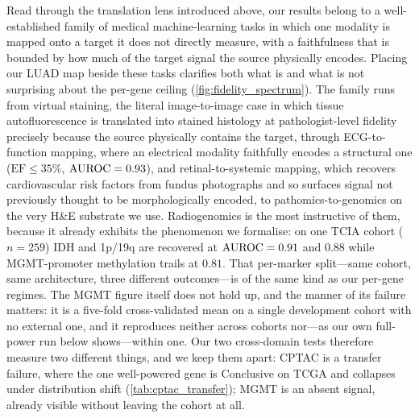 Read through the translation lens introduced above, our results
belong to a well-established family of medical machine-learning
tasks in which one modality is mapped onto a target it does not
directly measure, with a
faithfulness that is bounded by how much of the target signal the
source physically encodes.
Placing our LUAD map beside these tasks clarifies both what is and
what is not surprising about the per-gene ceiling
(\cref{fig:fidelity_spectrum}).
The family runs from virtual staining, the literal image-to-image
case in which tissue autofluorescence is translated into stained
histology at pathologist-level fidelity precisely because the source
physically contains the target\cite{rivenson2019virtualstaining},
through ECG-to-function mapping, where an electrical modality
faithfully encodes a structural one ($\mathrm{EF}\!\leq\!35\%$,
$\text{AUROC}=0.93$)\cite{attia2019ecg}, and retinal-to-systemic mapping,
which recovers cardiovascular risk factors from fundus photographs
and so surfaces signal not previously thought to be morphologically
encoded\cite{poplin2018retinal}, to pathomics-to-genomics on the
very H\&E substrate we use\cite{kather2019msi,kather2020pancancer}.
Radiogenomics is the most instructive of them, because it already
exhibits the phenomenon we formalise: on one TCIA cohort ($n\!=\!259$)
IDH and 1p/19q are recovered at $\text{AUROC}=0.91$ and $0.88$ while
MGMT-promoter methylation trails at
$0.81$\cite{chang2018radiogenomics}. That per-marker split---same
cohort, same architecture, three different outcomes---is of the same
kind as our per-gene regimes. The MGMT figure itself does not hold up,
and the manner of its failure matters: it is a five-fold
cross-validated mean on a single development cohort with no external
one, and it reproduces neither across cohorts nor---as our own
full-power run below shows---within one. Our two cross-domain tests
therefore measure
two different things, and we keep them apart: CPTAC is a transfer
failure, where the one well-powered gene is Conclusive on TCGA and
collapses under distribution shift (\cref{tab:cptac_transfer}); MGMT is
an absent signal, already visible without leaving the cohort at all.

